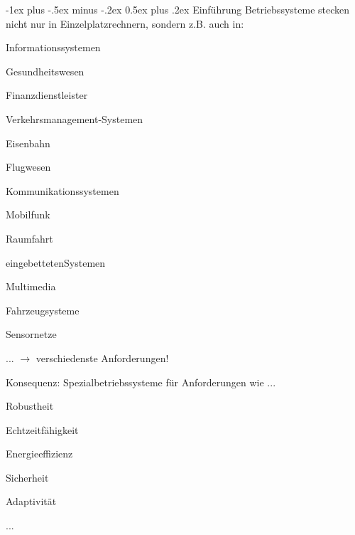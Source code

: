 \documentclass[a4paper]{article}
\makeatletter
\renewcommand{\section}{\@startsection{section}{1}{0mm}%
 {-1ex plus -.5ex minus -.2ex}%
 {0.5ex plus .2ex}%
 {\normalfont\large\bfseries}}
\makeatother
\begin{document}
\raggedright
\begin{multicols}{3}\scriptsize %
    \section{Einführung}
    Betriebssysteme stecken nicht nur in Einzelplatzrechnern, sondern z.B. auch in:

    \begin{itemize*}
        \item Informationssystemen
        \begin{itemize*}
            \item Gesundheitswesen
            \item Finanzdienstleister
        \end{itemize*}
        \item
        Verkehrsmanagement-Systemen
        \begin{itemize*}
            \item Eisenbahn
            \item Flugwesen
        \end{itemize*}
        \item
        Kommunikationssystemen
        \begin{itemize*}
            \item Mobilfunk
            \item Raumfahrt
        \end{itemize*}
        \item
        eingebettetenSystemen
        \begin{itemize*}
            \item Multimedia
            \item Fahrzeugsysteme
            \item Sensornetze
        \end{itemize*}
        \item
        ... $\rightarrow$  verschiedenste Anforderungen!
    \end{itemize*}

    Konsequenz: Spezialbetriebssysteme für Anforderungen wie ...

    \begin{itemize*}
        \item
        Robustheit
        \item
        Echtzeitfähigkeit
        \item
        Energieeffizienz
        \item
        Sicherheit
        \item
        Adaptivität
        \item
        ...
    \end{itemize*}


\end{multicols}
\end{document}
